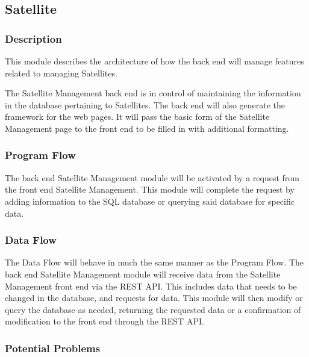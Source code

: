 
\subsection{Satellite}

\subsubsection{Description}

This module describes the architecture of how the back end will manage features related to managing Satellites. 

The Satellite Management back end is in control of maintaining the information in the database pertaining to Satellites. 
The back end will also generate the framework for the web pages. 
It will pass the basic form of the Satellite Management page to the front end to be filled in with additional formatting. 

\subsubsection{Program Flow}

The back end Satellite Management module will be activated by a request from the front end Satellite Management. 
This module will complete the request by adding information to the SQL database or querying said database for specific data. 

\subsubsection{Data Flow}

The Data Flow will behave in much the same manner as the Program Flow. 
The back end Satellite Management module will receive data from the Satellite Management front end via the REST API. 
This includes data that needs to be changed in the database, and requests for data. 
This module will then modify or query the database as needed, 
returning the requested data or a confirmation of modification to the front end through the REST API. 

\subsubsection{Potential Problems}

